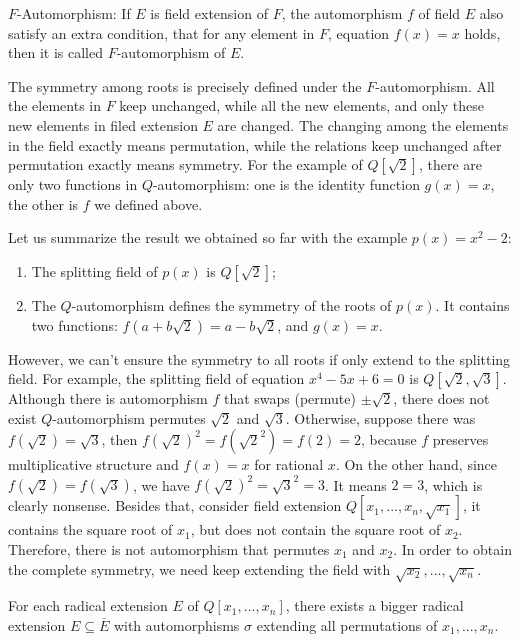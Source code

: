 \documentclass[b5paper]{article}
\begin{document}
\begin{definition}
$F$-Automorphism: If $E$ is field extension of $F$, the automorphism $f$ of field $E$ also satisfy an extra condition, that for any element in $F$, equation $f(x) = x$ holds, then it is called $F$-automorphism of $E$.
\end{definition}

The symmetry among roots is precisely defined under the $F$-automorphism. All the elements in $F$ keep unchanged, while all the new elements, and only these new elements in filed extension $E$ are changed. The changing among the elements in the field exactly means permutation, while the relations keep unchanged after permutation exactly means symmetry. For the example of $Q[\sqrt{2}]$, there are only two functions in $Q$-automorphism: one is the identity function $g(x) = x$, the other is $f$ we defined above.

Let us summarize the result we obtained so far with the example $p(x) = x^2 - 2$:

\begin{enumerate}
\item The splitting field of $p(x)$ is $Q[\sqrt{2}]$;
\item The $Q$-automorphism defines the symmetry of the roots of $p(x)$. It contains two functions: $f(a + b\sqrt{2}) = a - b\sqrt{2}$, and $g(x) = x$.
\end{enumerate}

However, we can't ensure the symmetry to all roots if only extend to the splitting field. For example, the splitting field of equation $x^4 - 5x + 6 = 0$ is $Q[\sqrt{2}, \sqrt{3}]$. Although there is automorphism $f$ that swaps (permute) $\pm \sqrt{2}$, there does not exist $Q$-automorphism permutes $\sqrt{2}$ and $\sqrt{3}$. Otherwise, suppose there was $f(\sqrt{2}) = \sqrt{3}$, then $f(\sqrt{2})^2 = f(\sqrt{2}^2) = f(2) = 2$, because $f$ preserves multiplicative structure and $f(x) = x$ for rational $x$. On the other hand, since $f(\sqrt{2}) = f(\sqrt{3})$, we have $f(\sqrt{2})^2 = \sqrt{3}^2 = 3$. It means $2 = 3$, which is clearly nonsense. Besides that, consider field extension $Q[x_1, ..., x_n, \sqrt{x_1}]$, it contains the square root of $x_1$, but does not contain the square root of $x_2$. Therefore, there is not automorphism that permutes $x_1$ and $x_2$. In order to obtain the complete symmetry, we need keep extending the field with $\sqrt{x_2}, ..., \sqrt{x_n}$.

\begin{theorem}
For each radical extension $E$ of $Q[x_1, ..., x_n]$, there exists a bigger radical extension $E \subseteq \overline{E}$ with automorphisms $\sigma$ extending all permutations of $x_1, ..., x_n$.
\end{theorem}
\end{document}

